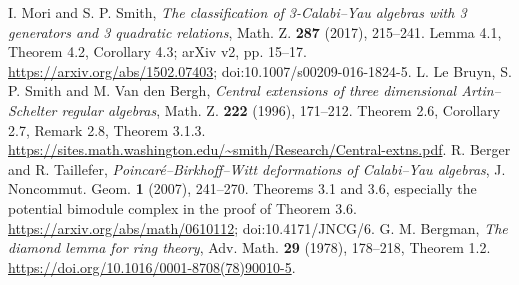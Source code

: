  I. Mori and S. P. Smith,
\emph{The classification of 3-Calabi--Yau algebras with 3 generators and 3 quadratic relations},
Math. Z. \textbf{287} (2017), 215--241.
Lemma 4.1, Theorem 4.2, Corollary 4.3; arXiv v2, pp. 15--17.
\url{https://arxiv.org/abs/1502.07403}; doi:10.1007/s00209-016-1824-5.
 L. Le Bruyn, S. P. Smith and M. Van den Bergh,
\emph{Central extensions of three dimensional Artin--Schelter regular algebras},
Math. Z. \textbf{222} (1996), 171--212.
Theorem 2.6, Corollary 2.7, Remark 2.8, Theorem 3.1.3.
\url{https://sites.math.washington.edu/~smith/Research/Central-extns.pdf}.
 R. Berger and R. Taillefer,
\emph{Poincar\'e--Birkhoff--Witt deformations of Calabi--Yau algebras},
J. Noncommut. Geom. \textbf{1} (2007), 241--270.
Theorems 3.1 and 3.6, especially the potential bimodule complex in the proof of Theorem 3.6.
\url{https://arxiv.org/abs/math/0610112}; doi:10.4171/JNCG/6.
 G. M. Bergman,
\emph{The diamond lemma for ring theory}, Adv. Math. \textbf{29} (1978), 178--218, Theorem 1.2.
\url{https://doi.org/10.1016/0001-8708(78)90010-5}.